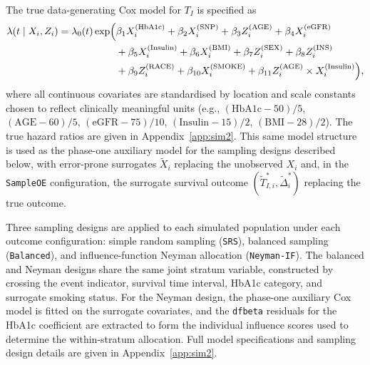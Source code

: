 The true data-generating Cox model for $T_I$ is specified as
\begin{equation}
\begin{split}
    \lambda(t \mid X_i, Z_i) = \lambda_0(t) \exp\Bigl(
      & \beta_1 X_i^{(\mathrm{HbA1c})}
      + \beta_2 X_i^{(\mathrm{SNP})}
      + \beta_3 Z_i^{(\mathrm{AGE})}
      + \beta_4 X_i^{(\mathrm{eGFR})}  \\
      &+ \beta_5 X_i^{(\mathrm{Insulin})}
      + \beta_6 X_i^{(\mathrm{BMI})}
      + \beta_7 Z_i^{(\mathrm{SEX})}
      + \beta_8 Z_i^{(\mathrm{INS})}  \\
      &+ \beta_9 Z_i^{(\mathrm{RACE})}
      + \beta_{10} X_i^{(\mathrm{SMOKE})}
      + \beta_{11} Z_i^{(\mathrm{AGE})} \times X_i^{(\mathrm{Insulin})}
    \Bigr),
\end{split}
    \label{eq:app_cox_true}
\end{equation}
where all continuous covariates are standardised by location and scale constants chosen to reflect clinically meaningful units (e.g., $(\mathrm{HbA1c} - 50)/5$, $(\mathrm{AGE} - 60)/5$, $(\mathrm{eGFR} - 75)/10$, $(\mathrm{Insulin} - 15)/2$, $(\mathrm{BMI} - 28)/2$). The true hazard ratios are given in Appendix~\ref{app:sim2}. This same model structure is used as the phase-one auxiliary model for the sampling designs described below, with error-prone surrogates $\tilde{X}_i$ replacing the unobserved $X_i$ and, in the \texttt{SampleOE} configuration, the surrogate survival outcome $(\tilde{T}_{I,i}^*, \tilde{\Delta}_i^*)$ replacing the true outcome.

Three sampling designs are applied to each simulated population under each outcome configuration: simple random sampling (\texttt{SRS}), balanced sampling (\texttt{Balanced}), and influence-function Neyman allocation (\texttt{Neyman-IF}). The balanced and Neyman designs share the same joint stratum variable, constructed by crossing the event indicator, survival time interval, HbA1c category, and surrogate smoking status. For the Neyman design, the phase-one auxiliary Cox model is fitted on the surrogate covariates, and the \texttt{dfbeta} residuals for the HbA1c coefficient are extracted to form the individual influence scores used to determine the within-stratum allocation. Full model specifications and sampling design details are given in Appendix~\ref{app:sim2}.

